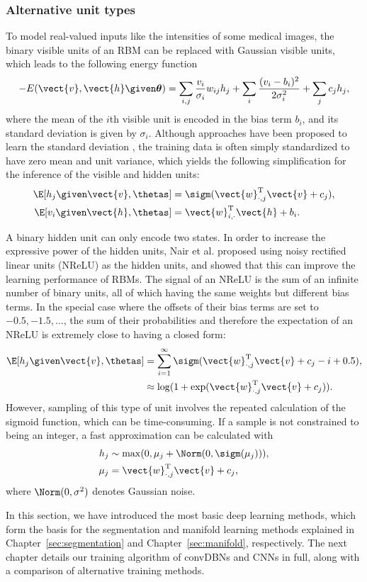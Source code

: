 \subsubsection{Alternative unit types}

To model real-valued inputs like the intensities of some medical images, the
binary visible units of an RBM can be replaced with Gaussian visible units, which
leads to the following energy function
\begin{equation} 
-E(\vect{v}, \vect{h}\given \boldsymbol{\theta}) = \sum_{i,
j}\frac{v_i}{\sigma_i} w_{ij} h_j + \sum_i \frac{(v_i - b_i)^2}{2\sigma_i^2} +
\sum_j c_j h_j,
\end{equation}
where the mean of the $i$th visible unit is encoded in the bias term $b_i$,
and its standard deviation is given by $\sigma_i$. Although approaches have been
proposed to learn the standard deviation \citep{cho2011}, the
training data is often simply standardized to have zero mean and unit variance,
which yields the following simplification for the inference of the visible
and hidden units:
\begin{align} 
\label{eq:ghgivenv}
\E[h_j \given \vect{v}, \thetas] &=
\sigm(\vect{w}_{\cdot,j}^\text{T}\vect{v} + c_j),\\
\label{eq:gvgivenh}
\E[v_i \given \vect{h}, \thetas] &= \vect{w}_{i,\cdot}^\text{T}\vect{h} +
b_i.
\end{align}

A binary hidden unit can only encode two states. In order to increase the
expressive power of the hidden units, Nair et al. proposed using noisy rectified
linear units (NReLU) \citep{nair2010} as the hidden units, and showed that this
can improve the learning performance of RBMs. The signal of an NReLU is the sum
of an infinite number of binary units, all of which having the same weights but
different bias terms. In the special case where the offsets of their bias
terms are set to $-0.5, -1.5, \dotsc$, the sum of their probabilities and
therefore the expectation of an NReLU is extremely close to having a closed form:
\begin{align}
\E[h_j \given \vect{v}, \thetas] &=
\sum_{i=1}^\infty \sigm(\vect{w}_{\cdot,j}^\text{T}\vect{v} + c_j - i + 0.5),\\
&\approx \log(1+\exp(\vect{w}_{\cdot,j}^\text{T}\vect{v} + c_j)).
\end{align}
However, sampling of this type of unit involves the repeated calculation of the
sigmoid function, which can be time-consuming. If a sample is not constrained
to being an integer, a fast approximation can be calculated with
\begin{align} 
h_j &\sim \max(0, \mu_j + \Norm(0, \sigm(\mu_j))), \\
\mu_j &= \vect{w}_{\cdot,j}^\text{T}\vect{v} + c_j,
\end{align}
where $\Norm(0, \sigma^2)$ denotes Gaussian noise.

In this section, we have introduced the most basic deep learning methods, which
form the basis for the segmentation and manifold learning methods explained in
Chapter~\ref{sec:segmentation} and Chapter~\ref{sec:manifold}, respectively. The
next chapter details our training algorithm of convDBNs and CNNs in full, along
with a comparison of alternative training methods.
